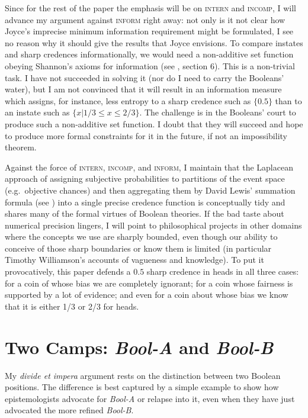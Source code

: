 \documentclass[11pt]{article}
\newcommand{\anderson}[0]{\textit{Bool-A}}
\newcommand{\augustin}[0]{\textit{Bool-B}}
\begin{document}
Since for the rest of the paper the emphasis will be on
\textsc{intern} and \textsc{incomp}, I will advance my argument
against \textsc{inform} right away: not only is it not clear how
Joyce's imprecise minimum information requirement might be formulated,
I see no reason why it should give the results that Joyce envisions.
To compare instates and sharp credences informationally, we would need
a non-additive set function obeying Shannon's axioms for information
(see , section 6). This is a non-trivial task. I
have not succeeded in solving it (nor do I need to carry the Booleans'
water), but I am not convinced that it will result in an information
measure which assigns, for instance, less entropy to a sharp credence
such as $\{0.5\}$ than to an instate such as
$\{x|1/3\leq{}x\leq{}2/3\}$. The challenge is in the Booleans' court
to produce such a non-additive set function. I doubt that they will
succeed and hope to produce more formal constraints for it in the
future, if not an impossibility theorem.

Against the force of \textsc{intern}, \textsc{incomp}, and
\textsc{inform}, I maintain that the Laplacean approach of assigning
subjective probabilities to partitions of the event space (e.g.\
objective chances) and then aggregating them by David Lewis' summation
formula (see \scite{8}{lewis81}{266f}) into a single precise credence
function is conceptually tidy and shares many of the formal virtues of
Boolean theories. If the bad taste about numerical precision lingers,
I will point to philosophical projects in other domains where the
concepts we use are sharply bounded, even though our ability to
conceive of those sharp boundaries or know them is limited (in
particular Timothy Williamson's accounts of vagueness and knowledge).
To put it provocatively, this paper defends a $0.5$ sharp credence in
heads in all three cases: for a coin of whose bias we are completely
ignorant; for a coin whose fairness is supported by a lot of evidence;
and even for a coin about whose bias we know that it is either 1/3 or
2/3 for heads.

\section{Two Camps: {\anderson} and {\augustin}}
\label{PlebeiansAndAristocrats}

My \emph{divide et impera} argument rests on the distinction between
two Boolean positions. The difference is best captured by a simple
example to show how epistemologists advocate for {\anderson} or
relapse into it, even when they have just advocated the more refined
{\augustin}.
\end{document}
